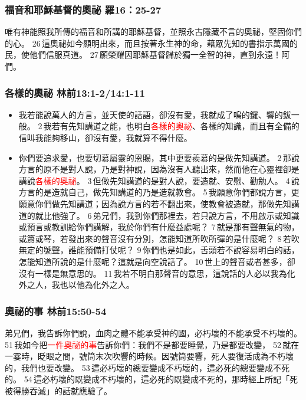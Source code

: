 \subsubsection{福音和耶穌基督的奧祕 羅16：25-27}
唯有神能照我所傳的福音和所講的耶穌基督，並照永古隱藏不言的奧祕，堅固你們的心。 26 這奧祕如今顯明出來，而且按著永生神的命，藉眾先知的書指示萬國的民，使他們信服真道。 27 願榮耀因耶穌基督歸於獨一全智的神，直到永遠！阿們。

\subsubsection{各樣的奧祕 林前13:1-2/14:1-11}
\begin{itemize}
\item 我若能說萬人的方言，並天使的話語，卻沒有愛，我就成了鳴的鑼、響的鈸一般。 2 我若有先知講道之能，也明白\textcolor{red}{各樣的奧祕}、各樣的知識，而且有全備的信叫我能夠移山，卻沒有愛，我就算不得什麼。
\item 你們要追求愛，也要切慕屬靈的恩賜，其中更要羨慕的是做先知講道。 2 那說方言的原不是對人說，乃是對神說，因為沒有人聽出來，然而他在心靈裡卻是講說\textcolor{red}{各樣的奧祕}。 3 但做先知講道的是對人說，要造就、安慰、勸勉人。 4 說方言的是造就自己，做先知講道的乃是造就教會。 5 我願意你們都說方言，更願意你們做先知講道；因為說方言的若不翻出來，使教會被造就，那做先知講道的就比他強了。 6 弟兄們，我到你們那裡去，若只說方言，不用啟示或知識或預言或教訓給你們講解，我於你們有什麼益處呢？ 7 就是那有聲無氣的物，或簫或琴，若發出來的聲音沒有分別，怎能知道所吹所彈的是什麼呢？ 8 若吹無定的號聲，誰能預備打仗呢？ 9 你們也是如此，舌頭若不說容易明白的話，怎能知道所說的是什麼呢？這就是向空說話了。 10 世上的聲音或者甚多，卻沒有一樣是無意思的。 11 我若不明白那聲音的意思，這說話的人必以我為化外之人，我也以他為化外之人。
\end{itemize}


\subsubsection{奧祕的事 林前15:50-54}
弟兄們，我告訴你們說，血肉之體不能承受神的國，必朽壞的不能承受不朽壞的。 51 我如今把\textcolor{red}{一件奧祕的事}告訴你們：我們不是都要睡覺，乃是都要改變， 52 就在一霎時，眨眼之間，號筒末次吹響的時候。因號筒要響，死人要復活成為不朽壞的，我們也要改變。 53 這必朽壞的總要變成不朽壞的，這必死的總要變成不死的。 54 這必朽壞的既變成不朽壞的，這必死的既變成不死的，那時經上所記「死被得勝吞滅」的話就應驗了。


